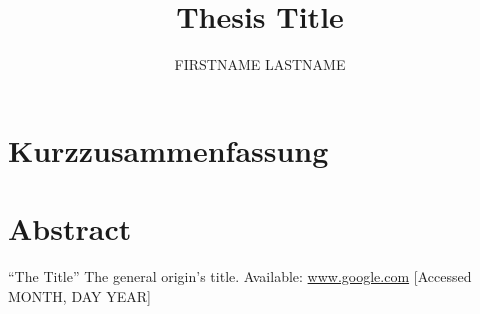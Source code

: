 \documentclass[
paper = a4,
fontsize = 12pt,
headinclude = true,
open = right,
twoside = true,
BCOR = 10mm,
toc = listofnumbered,
numbers = noendperiod,
]{report}
\title{Thesis Title}
\author{FIRSTNAME LASTNAME}
\date{\currenttime}
\begin{document}
	

	

	

    \section*{Kurzzusammenfassung}
	
    \section*{Abstract}
    

    \clearpage

	\tableofcontents
    \clearpage

	

	

    

	

    
    \clearpage
	\printglossary[type=\acronymtype,title=Abkürzungsverzeichnis,toctitle=Abkürzungsverzeichnis]

	\printglossary[title=Glossar,toctitle=Glossar]
    \clearpage

    \listoftables
    \listoffigures

    \begin{thebibliography}{9}

     ``The Title'' The general origin's title. Available: \url{www.google.com} [Accessed MONTH, DAY YEAR]

    \end{thebibliography}
\end{document}
